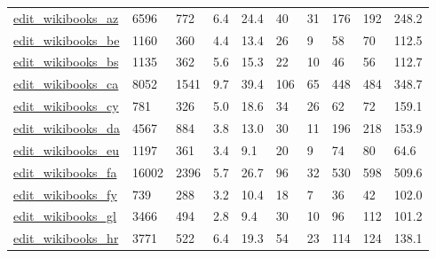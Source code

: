 \begin{longtable}{llllllllll}
 \href{http://konect.cc/networks/edit-enwikibooks}{edit\_wikibooks\_az}                                                       & 6596       & 772   & 6.4    & 24.4   & 40    & 31     & 176    & 192    & 248.2   \\
 \href{http://konect.cc/networks/edit-enwikibooks}{edit\_wikibooks\_be}                                                       & 1160       & 360   & 4.4    & 13.4   & 26    & 9      & 58     & 70     & 112.5   \\
 \href{http://konect.cc/networks/edit-enwikibooks}{edit\_wikibooks\_bs}                                                       & 1135       & 362   & 5.6    & 15.3   & 22    & 10     & 46     & 56     & 112.7   \\
 \href{http://konect.cc/networks/edit-enwikibooks}{edit\_wikibooks\_ca}                                                       & 8052       & 1541  & 9.7    & 39.4   & 106   & 65     & 448    & 484    & 348.7   \\
 \href{http://konect.cc/networks/edit-enwikibooks}{edit\_wikibooks\_cy}                                                       & 781        & 326   & 5.0    & 18.6   & 34    & 26     & 62     & 72     & 159.1   \\
 \href{http://konect.cc/networks/edit-enwikibooks}{edit\_wikibooks\_da}                                                       & 4567       & 884   & 3.8    & 13.0   & 30    & 11     & 196    & 218    & 153.9   \\
 \href{http://konect.cc/networks/edit-enwikibooks}{edit\_wikibooks\_eu}                                                       & 1197       & 361   & 3.4    & 9.1    & 20    & 9      & 74     & 80     & 64.6    \\
 \href{http://konect.cc/networks/edit-enwikibooks}{edit\_wikibooks\_fa}                                                       & 16002      & 2396  & 5.7    & 26.7   & 96    & 32     & 530    & 598    & 509.6   \\
 \href{http://konect.cc/networks/edit-enwikibooks}{edit\_wikibooks\_fy}                                                       & 739        & 288   & 3.2    & 10.4   & 18    & 7      & 36     & 42     & 102.0   \\
 \href{http://konect.cc/networks/edit-enwikibooks}{edit\_wikibooks\_gl}                                                       & 3466       & 494   & 2.8    & 9.4    & 30    & 10     & 96     & 112    & 101.2   \\
 \href{http://konect.cc/networks/edit-enwikibooks}{edit\_wikibooks\_hr}                                                       & 3771       & 522   & 6.4    & 19.3   & 54    & 23     & 114    & 124    & 138.1   \\

\end{longtable}
